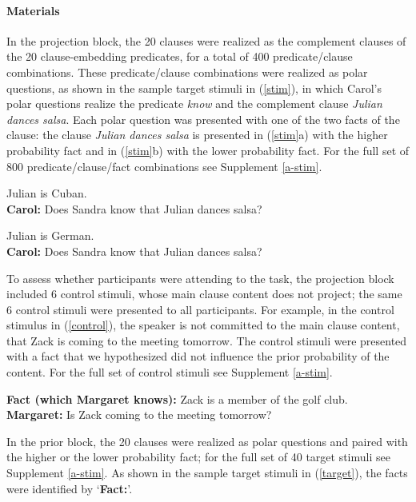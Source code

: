 \documentclass[11pt,fleqn]{article}
\newcommand{\6}{\mbox{$[\hspace*{-.6mm}[$}}
\newcommand{\9}{\mbox{$]\hspace*{-.6mm}]$}}
\begin{document}
\paragraph{Materials} In the projection block, the 20 clauses were realized as the complement clauses of the 20 clause-embedding predicates, for a total of 400 predicate/clause combinations. These predicate/clause combinations were realized as polar questions, as shown in the sample target stimuli in (\ref{stim}), in which Carol's polar questions realize the predicate {\em know} and the complement clause {\em Julian dances salsa}. Each polar question was presented with one of the two facts of the clause: the clause {\em Julian dances salsa} is presented in (\ref{stim}a) with the higher probability fact and in (\ref{stim}b) with the lower probability fact. For the full set of 800 predicate/clause/fact combinations see Supplement \ref{a-stim}.

 
\begin{exe}
\ex\label{stim}
\begin{xlist}
 Julian is Cuban.  \\ 
{\bf Carol:} Does Sandra know that Julian dances salsa?

 Julian is German.  \\ 
{\bf Carol:} Does Sandra know that Julian dances salsa?
\end{xlist}
\end{exe}
To assess whether participants were attending to the task, the projection block included 6 control stimuli, whose main clause content does not project; the same 6 control stimuli were presented to all participants. For example, in the control stimulus in (\ref{control}), the speaker is not committed to the main clause content, that Zack is coming to the meeting tomorrow. The control stimuli were presented with a fact that we hypothesized did not influence the prior probability of the content. For the full set of control stimuli see Supplement \ref{a-stim}.

\begin{exe}
\ex\label{control} {\bf Fact (which Margaret knows):}  Zack is a member of the golf club. \\ {\bf Margaret:} Is Zack coming to the meeting tomorrow?
\end{exe}

In the prior block, the 20 clauses were realized as polar questions and paired with the higher or the lower probability fact; for the full set of 40 target stimuli see Supplement \ref{a-stim}. As shown in the sample target stimuli in (\ref{target}), the facts were identified by `{\bf Fact:}'. 
\end{document}
